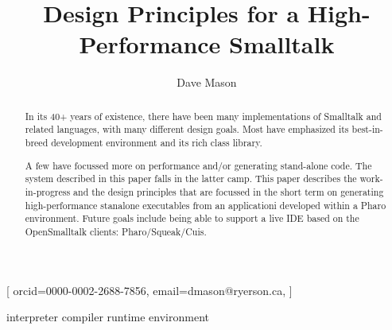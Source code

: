 \documentclass[
]{ceurart}
\begin{document}


\title{Design Principles for a High-Performance Smalltalk}


\author{Dave Mason}[
orcid=0000-0002-2688-7856,
email=dmason@ryerson.ca,
]

\address{Toronto Metropolitan University, Toronto, Canada}

\begin{abstract}
  In its 40+ years of existence, there have been many implementations of Smalltalk and related languages, with many different design goals.
  Most have emphasized its best-in-breed development environment and its rich class library.

  A few have focussed more on performance and/or generating stand-alone code.
  The system described in this paper falls in the latter camp.
  This paper describes the work-in-progress and the design principles that are focussed in the short term on generating high-performance stanalone executables from an applicationi developed within a Pharo environment.
  Future goals include being able to support a live IDE based on the OpenSmalltalk clients: Pharo/Squeak/Cuis.
\end{abstract}

\begin{keywords}
interpreter
compiler
runtime environment
\end{keywords}

\maketitle
\end{document}
